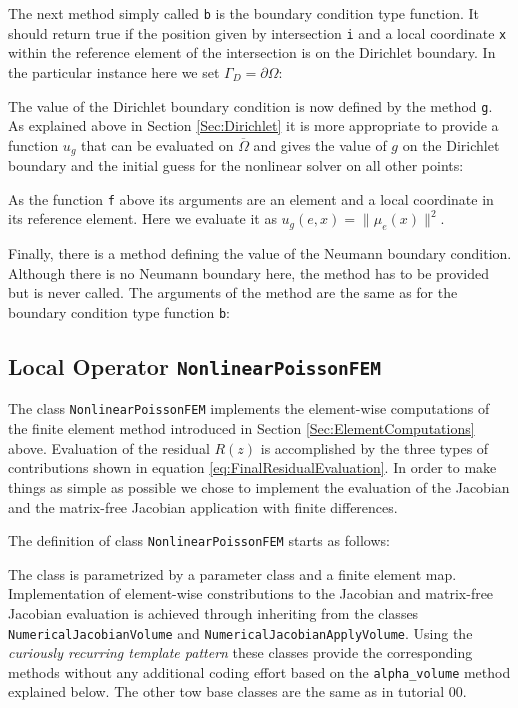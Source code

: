 \documentclass[a4paper,12pt]{article}
\begin{document}
The next method simply called \lstinline{b} is the boundary condition
type function. It should return true if the position given
by intersection \lstinline{i} and a local coordinate \lstinline{x} within
the reference element of the intersection is on the Dirichlet boundary.
In the particular instance here we set $\Gamma_D=\partial\Omega$:


The value of the Dirichlet boundary condition is now defined by the
method \lstinline{g}. As explained above in Section \ref{Sec:Dirichlet} it
is more appropriate to provide a function $u_g$ that can be evaluated
on $\overline{\Omega}$ and gives the value of $g$ on the Dirichlet boundary
and the initial guess for the nonlinear solver on all other points:

As the function \lstinline{f} above its arguments are an element and a local coordinate
in its reference element. Here we evaluate it as $u_g(e,x) = \|\mu_e(x)\|^2$.

Finally, there is a method defining the value of the Neumann boundary condition.
Although there is no Neumann boundary here, the method has to be provided but is
never called. The arguments of the method are the same as for the boundary
condition type function \lstinline{b}:



\subsection{Local Operator \lstinline{NonlinearPoissonFEM}}

The class \lstinline{NonlinearPoissonFEM} implements the
element-wise computations of the finite element method
introduced in Section \ref{Sec:ElementComputations} above.
Evaluation of the residual $R(z)$ is accomplished
by the three types of contributions shown in equation \eqref{eq:FinalResidualEvaluation}.
In order to make things as simple as possible we chose to implement
the evaluation of the Jacobian and the matrix-free Jacobian application
with finite differences. 

The definition of class \lstinline{NonlinearPoissonFEM} starts as follows:

The class is parametrized by a parameter class and a finite element map.
Implementation of element-wise constributions to the Jacobian and matrix-free
Jacobian evaluation is achieved through inheriting from the
classes \lstinline{NumericalJacobianVolume} and \lstinline{NumericalJacobianApplyVolume}.
Using the \textit{curiously recurring template pattern} these classes provide 
the corresponding methods without any additional coding effort
based on the \lstinline{alpha_volume} method explained below.
The other tow base classes are the same as in tutorial 00.
\end{document}
